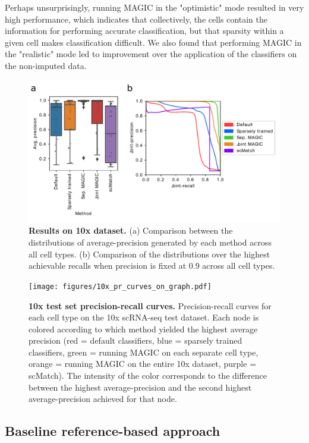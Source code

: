Perhaps unsurprisingly, running MAGIC in the "optimistic" mode resulted in very high performance, which indicates that collectively, the cells contain the information for performing accurate classification, but that sparsity within a given cell makes classification difficult.  We also found that performing MAGIC in the "realistic" mode led to improvement over the application of the classifiers on the non-imputed data. 

 \begin{figure}[h!]
      \centerline{\includegraphics[width=13cm]{figures/10x_results.pdf}}
      \caption{\textbf{Results on 10x dataset.} (a) Comparison between the distributions of average-precision generated by each method across all cell types.  (b) Comparison of the distributions over the highest achievable recalls when precision is fixed at 0.9 across all cell types.}
      \label{fig:10x_results}
      \end{figure}

 \begin{figure}[h!]
      \centerline{\texttt{[image: figures/10x\_pr\_curves\_on\_graph.pdf]}}
      \caption{\textbf{10x test set precision-recall curves.} Precision-recall curves for each cell type on the 10x scRNA-seq test dataset. Each node is colored according to which method yielded the highest average precision (red = default classifiers, blue = sparsely trained classifiers, green = running MAGIC on each separate cell type, orange = running MAGIC on the entire 10x dataset, purple = scMatch). The intensity of the color corresponds to the difference between the highest average-precision and the second highest average-precision achieved for that node.}
      \label{fig:10x_pr_curves}
      \end{figure}



\subsection{Baseline reference-based approach}

